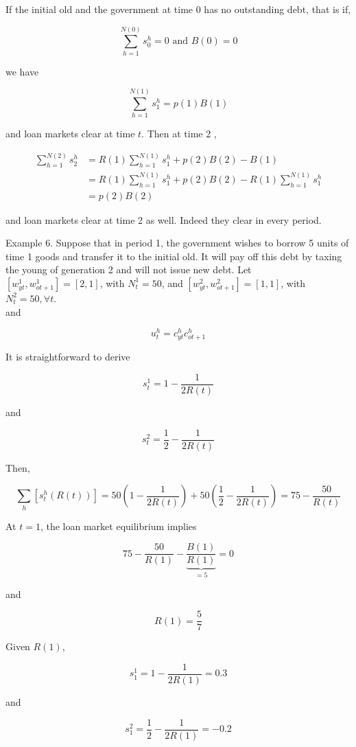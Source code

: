 \documentclass[10pt]{article}
\begin{document}
If the initial old and the government at time 0 has no outstanding debt, that is if,

$$
\sum_{h=1}^{N(0)} s_{0}^{h}=0 \text { and } B(0)=0
$$

we have

$$
\sum_{h=1}^{N(1)} s_{1}^{h}=p(1) B(1)
$$

and loan markets clear at time $t$. Then at time 2 ,

$$
\begin{aligned}
\sum_{h=1}^{N(2)} s_{2}^{h} & =R(1) \sum_{h=1}^{N(1)} s_{1}^{h}+p(2) B(2)-B(1) \\
& =R(1) \sum_{h=1}^{N(1)} s_{1}^{h}+p(2) B(2)-R(1) \sum_{h=1}^{N(1)} s_{1}^{h} \\
& =p(2) B(2)
\end{aligned}
$$

and loan markets clear at time 2 as well. Indeed they clear in every period.

Example 6. Suppose that in period 1, the government wishes to borrow 5 units of time 1 goods and transfer it to the initial old. It will pay off this debt by taxing the young of generation 2 and will not issue new debt. Let\\
$\left[w_{y t}^{1}, w_{o t+1}^{1}\right]=[2,1]$, with $N_{t}^{1}=50$, and $\left[w_{y t}^{2}, w_{o t+1}^{2}\right]=[1,1]$, with $N_{t}^{2}=50, \forall t$.\\
and

$$
u_{t}^{h}=c_{y t}^{h} c_{o t+1}^{h}
$$

It is straightforward to derive

$$
s_{t}^{1}=1-\frac{1}{2 R(t)}
$$

and

$$
s_{t}^{2}=\frac{1}{2}-\frac{1}{2 R(t)}
$$

Then,

$$
\sum_{h}\left[s_{t}^{h}(R(t))\right]=50\left(1-\frac{1}{2 R(t)}\right)+50\left(\frac{1}{2}-\frac{1}{2 R(t)}\right)=75-\frac{50}{R(t)}
$$

At $t=1$, the loan market equilibrium implies

$$
75-\frac{50}{R(1)}-\underbrace{\frac{B(1)}{R(1)}}_{=5}=0
$$

and

$$
R(1)=\frac{5}{7}
$$

Given $R(1)$,

$$
s_{1}^{1}=1-\frac{1}{2 R(1)}=0.3
$$

and

$$
s_{1}^{2}=\frac{1}{2}-\frac{1}{2 R(1)}=-0.2
$$
\end{document}
